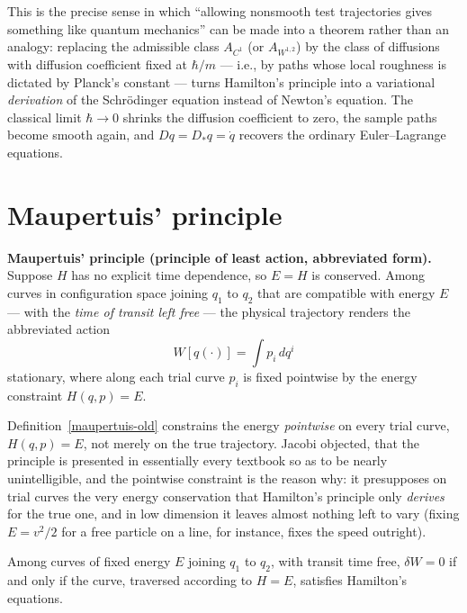 This is the precise sense in which ``allowing nonsmooth test trajectories gives
something like quantum mechanics'' can be made into a theorem rather than an
analogy: replacing the admissible class $A_{C^1}$ (or $A_{W^{1,2}}$) 
 by the class of diffusions with diffusion
coefficient fixed at $\hbar/m$ --- i.e., by paths whose local roughness is
dictated by Planck's constant --- turns Hamilton's principle into a variational
\emph{derivation} of the Schr\"odinger equation instead of Newton's equation.
The classical limit $\hbar\to 0$ shrinks the diffusion coefficient to zero, the
sample paths become smooth again, and $Dq=D_\ast q=\dot q$ recovers the
ordinary Euler--Lagrange equations.

\section{Maupertuis' principle}
\label{sec:vp-maupertuis}

\begin{definition}
\label{maupertuis-old}
\textbf{Maupertuis' principle (principle of least action, abbreviated form).}
    Suppose $H$ has no explicit time dependence, so $E=H$ is conserved. Among
    curves in configuration space joining $q_1$ to $q_2$ that are compatible
    with energy $E$ --- with the \emph{time of transit left free} --- the
    physical trajectory renders the abbreviated action
\[
W[q(\cdot)] = \int p_i\,dq^i
\]
stationary, where along each trial curve $p_i$ is fixed pointwise by the energy
    constraint $H(q,p)=E$.
\end{definition}

\begin{remark}
\label{jacobi-complaint}
Definition~\ref{maupertuis-old} constrains the energy \emph{pointwise} on every trial curve, $H(q,p)=E$, not merely on the true trajectory. Jacobi  objected, that the principle is presented in essentially every textbook so as to be nearly unintelligible, and the pointwise constraint is the reason why: it presupposes on trial curves the very energy conservation that Hamilton's principle only \emph{derives} for the true one, and in low dimension it leaves almost nothing left to vary (fixing $E=v^2/2$ for a free particle on a line, for instance, fixes the speed outright). 
\end{remark}

\begin{theorem}
Among curves of fixed energy $E$ joining $q_1$ to $q_2$, with transit time
    free, $\delta W=0$ if and only if the curve, traversed according to $H=E$,
    satisfies Hamilton's equations.
\end{theorem}

